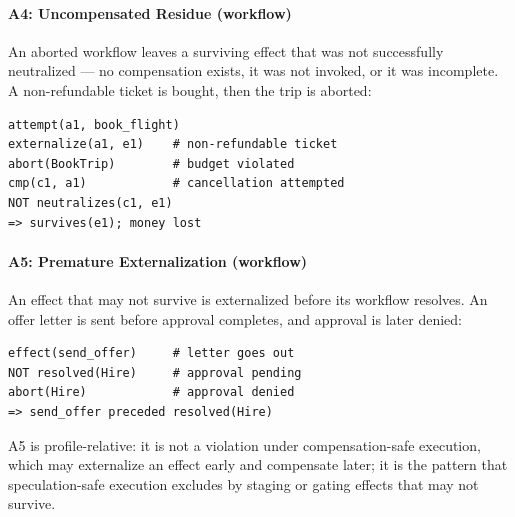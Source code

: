 \documentclass{article}
\begin{document}
\paragraph{A4: Uncompensated Residue (workflow)}
An aborted workflow leaves a surviving effect that was not
successfully neutralized --- no compensation exists, it was not invoked,
or it was incomplete. A non-refundable ticket is bought, then the trip is
aborted:
\par\vspace{2pt}\noindent\begin{minipage}{\linewidth}
\begingroup\footnotesize\begin{verbatim}
attempt(a1, book_flight)
externalize(a1, e1)    # non-refundable ticket
abort(BookTrip)        # budget violated
cmp(c1, a1)            # cancellation attempted
NOT neutralizes(c1, e1)
=> survives(e1); money lost
\end{verbatim}\endgroup
\end{minipage}\par

\paragraph{A5: Premature Externalization (workflow)}
An effect that may not survive is externalized before its workflow
resolves. An offer letter is sent before approval completes, and approval
is later denied:
\par\vspace{2pt}\noindent\begin{minipage}{\linewidth}
\begingroup\footnotesize\begin{verbatim}
effect(send_offer)     # letter goes out
NOT resolved(Hire)     # approval pending
abort(Hire)            # approval denied
=> send_offer preceded resolved(Hire)
\end{verbatim}\endgroup
\end{minipage}\par\noindent
A5 is profile-relative: it is not a violation under compensation-safe
execution, which may externalize an effect early and compensate later; it
is the pattern that speculation-safe execution excludes by staging or
gating effects that may not survive.
\end{document}

